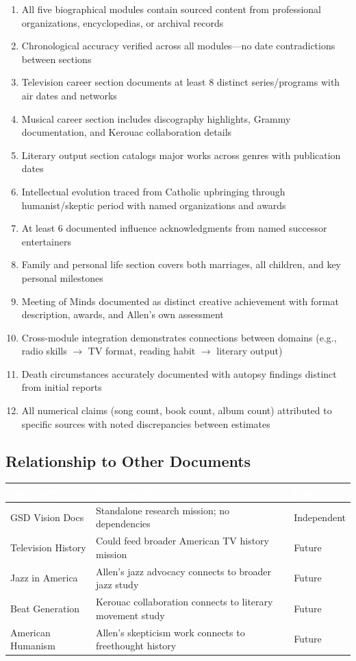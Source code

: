 \documentclass[11pt,letterpaper]{article}
\newcommand{\tableheader}[1]{\textbf{\sffamily\textcolor{white}{#1}}}
\begin{document}
\begin{enumerate}[leftmargin=2em]
\item All five biographical modules contain sourced content from professional organizations, encyclopedias, or archival records
\item Chronological accuracy verified across all modules---no date contradictions between sections
\item Television career section documents at least 8 distinct series/programs with air dates and networks
\item Musical career section includes discography highlights, Grammy documentation, and Kerouac collaboration details
\item Literary output section catalogs major works across genres with publication dates
\item Intellectual evolution traced from Catholic upbringing through humanist/skeptic period with named organizations and awards
\item At least 6 documented influence acknowledgments from named successor entertainers
\item Family and personal life section covers both marriages, all children, and key personal milestones
\item Meeting of Minds documented as distinct creative achievement with format description, awards, and Allen's own assessment
\item Cross-module integration demonstrates connections between domains (e.g., radio skills $\rightarrow$ TV format, reading habit $\rightarrow$ literary output)
\item Death circumstances accurately documented with autopsy findings distinct from initial reports
\item All numerical claims (song count, book count, album count) attributed to specific sources with noted discrepancies between estimates
\end{enumerate}

\subsection{Relationship to Other Documents}

\begin{center}
\begin{tabularx}{\textwidth}{L{4cm}XC{2.5cm}}
\toprule
{}
\tableheader{Document} & \tableheader{Relationship} & \tableheader{Status} \\
\midrule
GSD Vision Docs & Standalone research mission; no dependencies & Independent \\
Television History & Could feed broader American TV history mission & Future \\
Jazz in America & Allen's jazz advocacy connects to broader jazz study & Future \\
Beat Generation & Kerouac collaboration connects to literary movement study & Future \\
American Humanism & Allen's skepticism work connects to freethought history & Future \\
\bottomrule
\end{tabularx}
\end{center}
\end{document}
